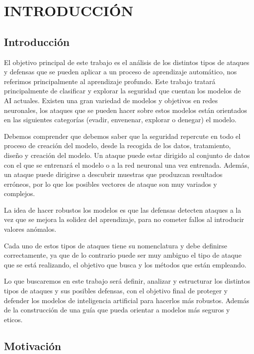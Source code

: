 \chapter{INTRODUCCIÓN}
\label{ch:1}

\section{Introducción}

El objetivo principal de este trabajo es el análisis de los distintos tipos de ataques y defensas que se pueden aplicar a un proceso de aprendizaje automático, nos referimos principalmente al aprendizaje profundo.
Este trabajo tratará principalmente de clasificar y explorar la seguridad que cuentan los modelos de \gls{AI} actuales.
Existen una gran variedad de modelos y objetivos en redes neuronales, los ataques que se pueden hacer sobre estos modelos están orientados en las siguientes categorías (evadir, envenenar, explorar o denegar) el modelo.

Debemos comprender que debemos saber que la seguridad repercute en todo el proceso de creación del modelo, desde la recogida de los datos, tratamiento, diseño y creación del modelo.
Un ataque puede estar dirigido al conjunto de datos con el que se entrenará el modelo o a la red neuronal una vez entrenada.
Además, un ataque puede dirigirse a descubrir muestras que produzcan resultados erróneos, por lo que los posibles vectores de ataque son muy variados y complejos.

La idea de hacer robustos los modelos es que las defensas detecten ataques a la vez que se mejora la solidez del aprendizaje, para no cometer fallos al introducir valores anómalos.

Cada uno de estos tipos de ataques tiene su nomenclatura y debe definirse correctamente, ya que de lo contrario puede ser muy ambiguo el tipo de ataque que se está realizando, el objetivo que busca y los métodos que están empleando.

Lo que buscaremos en este trabajo será definir, analizar y estructurar los distintos tipos de ataques y sus posibles defensas, con el objetivo final de proteger y defender los modelos de inteligencia artificial para hacerlos más robustos.
Además de la construcción de una guía que pueda orientar a modelos más seguros y eticos.


\section{Motivación}

